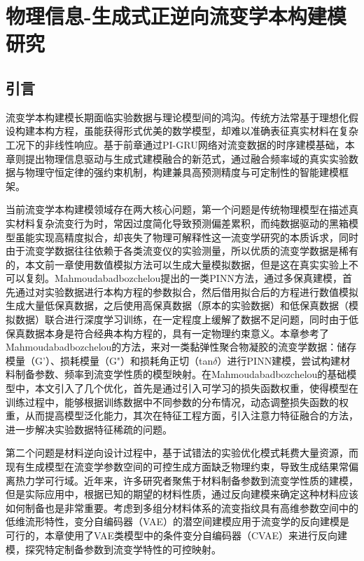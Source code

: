 \chapter{物理信息-生成式正逆向流变学本构建模研究}
\section{引言}
流变学本构建模长期面临实验数据与理论模型间的鸿沟。传统方法常基于理想化假设构建本构方程，虽能获得形式优美的数学模型，却难以准确表征真实材料在复杂工况下的非线性响应。基于前章通过PI-GRU网络对流变数据的时序建模基础，本章则提出物理信息驱动与生成式建模融合的新范式，通过融合频率域的真实实验数据与物理守恒定律的强约束机制，构建兼具高预测精度与可定制性的智能建模框架。

当前流变学本构建模领域存在两大核心问题，第一个问题是传统物理模型在描述真实材料复杂流变行为时，常因过度简化导致预测偏差累积，而纯数据驱动的黑箱模型虽能实现高精度拟合，却丧失了物理可解释性这一流变学研究的本质诉求，同时由于流变学数据往往依赖于各类流变仪的实验测量，所以优质的流变学数据是稀有的，本文前一章使用数值模拟方法可以生成大量模拟数据，但是这在真实实验上不可以复刻。Mahmoudabadbozchelou提出的一类PINN方法，通过多保真建模，首先通过对实验数据进行本构方程的参数拟合，然后借用拟合后的方程进行数值模拟生成大量低保真数据，之后使用高保真数据（原本的实验数据）和低保真数据（模拟数据）联合进行深度学习训练，在一定程度上缓解了数据不足问题，同时由于低保真数据本身是符合经典本构方程的，具有一定物理约束意义。本章参考了Mahmoudabadbozchelou的方法，来对一类黏弹性聚合物凝胶的流变学数据：储存模量（G'）、损耗模量（G"）和损耗角正切（tan$\delta$）进行PINN建模，尝试构建材料制备参数、频率到流变学性质的模型映射。在Mahmoudabadbozchelou的基础模型中，本文引入了几个优化，首先是通过引入可学习的损失函数权重，使得模型在训练过程中，能够根据训练数据中不同参数的分布情况，动态调整损失函数的权重，从而提高模型泛化能力，其次在特征工程方面，引入注意力特征融合的方法，进一步解决实验数据特征稀疏的问题。

第二个问题是材料逆向设计过程中，基于试错法的实验优化模式耗费大量资源，而现有生成模型在流变学参数空间的可控生成方面缺乏物理约束，导致生成结果常偏离热力学可行域。近年来，许多研究者聚焦于材料制备参数到流变学性质的建模，但是实际应用中，根据已知的期望的材料性质，通过反向建模来确定这种材料应该如何制备也是非常重要。考虑到多组分材料体系的流变指纹具有高维参数空间中的低维流形特性，变分自编码器（VAE）的潜空间建模应用于流变学的反向建模是可行的，本章使用了VAE类模型中的条件变分自编码器（CVAE）来进行反向建模，探究特定制备参数到流变学特性的可控映射。

